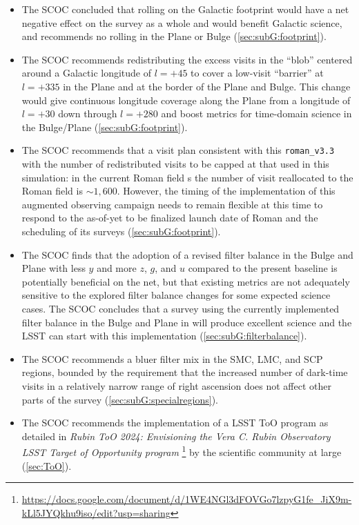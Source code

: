 \begin{itemize}
\item The SCOC concluded that rolling on the Galactic footprint would have a net negative effect on the survey as a whole and would benefit Galactic science, and recommends no rolling in the Plane or Bulge (\autoref{sec:subG:footprint}).


\item The SCOC recommends redistributing the excess visits in the ``blob'' centered around a Galactic longitude of $l=+45$ to cover a low-visit ``barrier'' at $l=+335$ in the Plane and at the border of the Plane and Bulge. This change would give continuous longitude coverage along the Plane from a longitude of $l=+30$ down through $l=+280$ and boost metrics for time-domain science in the Bulge/Plane (\autoref{sec:subG:footprint}).

\item The SCOC recommends that a visit plan consistent with this \texttt{roman\_v3.3} with the number of redistributed visits to be capped at that used in this simulation: in the current Roman field \opsim s the number of visit reallocated to the Roman field is $\sim1,600$. However, the timing of the implementation of this augmented observing campaign needs to remain flexible at this time to respond to the as-of-yet to be finalized launch date of Roman and the scheduling of its surveys (\autoref{sec:subG:footprint}).

\item The SCOC finds that the adoption of a revised filter balance in the Bulge and Plane with less $y$ and more $z$, $g$, and $u$ compared to the present baseline is potentially beneficial on the net, but that existing metrics are not adequately sensitive to the explored filter balance changes for some expected science cases. The SCOC concludes that a survey using the currently implemented filter balance in the Bulge and Plane in  will produce excellent science and the LSST can start with this implementation (\autoref{sec:subG:filterbalance}).

\item The SCOC recommends a bluer filter mix in the SMC, LMC, and SCP regions, bounded by the requirement that the increased number of dark-time visits in a relatively narrow range of right ascension does not affect other parts of the survey (\autoref{sec:subG:specialregions}).

\item The SCOC recommends the implementation of a LSST ToO program as detailed in \emph{Rubin ToO 2024: 
Envisioning the Vera C. Rubin Observatory LSST Target of Opportunity program
}\footnote{\url{https://docs.google.com/document/d/1WE4NGl3dFOVGo7lzpyG1fe_JiX9m-kLl5JYQkhu9iso/edit?usp=sharing}} by the scientific community at large (\autoref{sec:ToO}).


\end{itemize}
